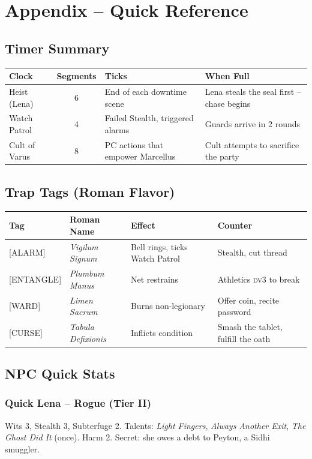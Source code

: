 \documentclass[10pt,twoside]{book}
\newcommand{\tag}[1]{\textsc{[#1]}}
\newcommand{\dv}{\textsc{dv}}
\begin{document}
\chapter{Appendix -- Quick Reference}

\section{Timer Summary}

\begin{longtable}{p{4cm} c p{5cm} p{3cm}}
\toprule
\textbf{Clock} & \textbf{Segments} & \textbf{Ticks} & \textbf{When Full} \\
\midrule
Heist (Lena) & 6 & End of each downtime scene & Lena steals the seal first -- chase begins \\
Watch Patrol & 4 & Failed Stealth, triggered alarms & Guards arrive in 2 rounds \\
Cult of Varus & 8 & PC actions that empower Marcellus & Cult attempts to sacrifice the party \\
\bottomrule
\end{longtable}

\section{Trap Tags (Roman Flavor)}

\begin{longtable}{p{2.5cm} p{3cm} p{4cm} p{3cm}}
\toprule
\textbf{Tag} & \textbf{Roman Name} & \textbf{Effect} & \textbf{Counter} \\
\midrule
\tag{ALARM} & \textit{Vigilum Signum} & Bell rings, ticks Watch Patrol & Stealth, cut thread \\
\tag{ENTANGLE} & \textit{Plumbum Manus} & Net restrains & Athletics \dv 3 to break \\
\tag{WARD} & \textit{Limen Sacrum} & Burns non-legionary & Offer coin, recite password \\
\tag{CURSE} & \textit{Tabula Defixionis} & Inflicts condition & Smash the tablet, fulfill the oath \\
\bottomrule
\end{longtable}

\section{NPC Quick Stats}

\subsection{Quick Lena -- Rogue (Tier II)}
Wits 3, Stealth 3, Subterfuge 2. Talents: \textit{Light Fingers}, \textit{Always Another Exit}, \textit{The Ghost Did It} (once). Harm 2. Secret: she owes a debt to Peyton, a Sidhi smuggler.
\end{document}
